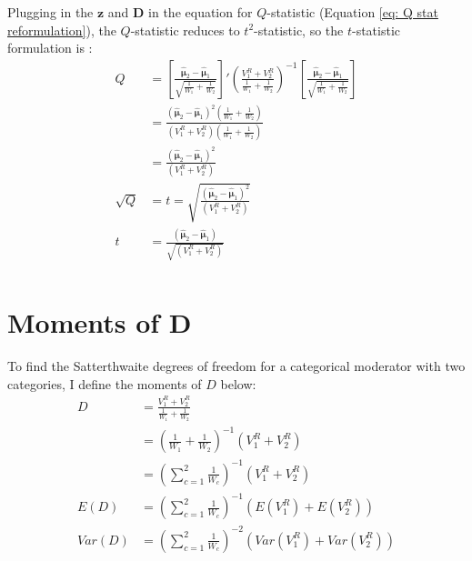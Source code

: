 Plugging in the $\mathbf{z}$ and $\mathbf{D}$ in the equation for $Q$-statistic (Equation \ref{eq: Q stat reformulation}),  the $Q$-statistic reduces to  $t^2$-statistic, so the $t$-statistic formulation is :
\begin{equation}
    \begin{split}
        Q &= \left[\frac{\mathbf{\hat{\mu}}_2 - \mathbf{\hat{\mu}}_1}{\sqrt{\frac{1}{W_1} + \frac{1}{W_2}}} \right]' \left( \frac{V^R_1 + V^R_2 }{\frac{1}{W_1} + \frac{1}{W_2} }  \right)^{-1} \left[\frac{ \mathbf{\hat{\mu}}_2 - \mathbf{\hat{\mu}}_1 }{\sqrt{\frac{1}{W_1} + \frac{1}{W_2}}}   \right] \\
         &= \frac{\left(\mathbf{\hat{\mu}}_2 - \mathbf{\hat{\mu}}_1  \right)^2 \left(\frac{1}{W_1} + \frac{1}{W_2}\right) }{\left(V^R_1 + V^R_2 \right)\left(\frac{1}{W_1} + \frac{1}{W_2}\right)} \\
         &= \frac{\left(\mathbf{\hat{\mu}}_2 - \mathbf{\hat{\mu}}_1  \right)^2}{\left(V^R_1 + V^R_2 \right)} \\
         \sqrt{Q} &= t = \sqrt{\frac{\left(\mathbf{\hat{\mu}}_2 - \mathbf{\hat{\mu}}_1  \right)^2}{\left(V^R_1 + V^R_2 \right)}} \\
         t &= \frac{\left(\mathbf{\hat{\mu}}_2 - \mathbf{\hat{\mu}}_1  \right)}{\sqrt{\left(V^R_1 + V^R_2 \right)} } \\
    \end{split}
    \nonumber
\end{equation}
  
\section{Moments of D}

To find the Satterthwaite degrees of freedom for a categorical moderator with two categories, I define the moments of $D$ below:
\begin{equation}
    \begin{split}
        D & = \frac{V^R_1 + V^R_2 }{\frac{1}{W_1} + \frac{1}{W_2} } \\
        & = \left(\frac{1}{W_1} + \frac{1}{W_2}\right)^{-1} \left(V^R_1 + V^R_2  \right) \\
        & = \left(\sum_{c=1}^2 \frac{1}{W_c}  \right)^{-1} \left(V^R_1 + V^R_2  \right) \\
        E(D) & = \left(\sum_{c=1}^2 \frac{1}{W_c}  \right)^{-1} \left(E(V^R_1) + E(V^R_2)  \right) \\
         Var(D) & = \left(\sum_{c=1}^2 \frac{1}{W_c}  \right)^{-2 } \left(Var(V^R_1) + Var(V^R_2)  \right) \\
    \end{split}
    \nonumber
\end{equation}

